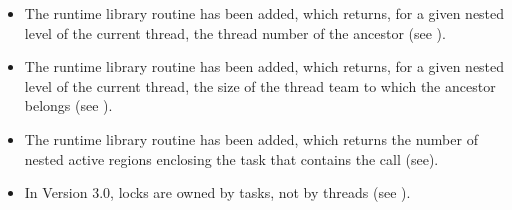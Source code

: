 \begin{itemize}
\item The  runtime library routine has been added,
which returns, for a given nested level of the current thread, the thread number of the
ancestor (see
).

\item The  runtime library routine has been added, which returns,
for a given nested level of the current thread, the size of the thread team to which the
ancestor belongs (see
).

\item The  runtime library routine has been added, which
returns the number of nested active  regions enclosing the task that
contains the call (see\linebreak {}).

\item In Version 3.0, locks are owned by tasks, not by threads (see
).
\end{itemize}



